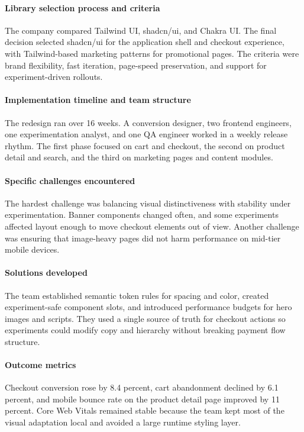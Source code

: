 \paragraph{Library selection process and criteria}
The company compared Tailwind UI, shadcn/ui, and Chakra UI. The final decision selected shadcn/ui for the application shell and checkout experience, with Tailwind-based marketing patterns for promotional pages. The criteria were brand flexibility, fast iteration, page-speed preservation, and support for experiment-driven rollouts.

\paragraph{Implementation timeline and team structure}
The redesign ran over 16 weeks. A conversion designer, two frontend engineers, one experimentation analyst, and one QA engineer worked in a weekly release rhythm. The first phase focused on cart and checkout, the second on product detail and search, and the third on marketing pages and content modules.

\paragraph{Specific challenges encountered}
The hardest challenge was balancing visual distinctiveness with stability under experimentation. Banner components changed often, and some experiments affected layout enough to move checkout elements out of view. Another challenge was ensuring that image-heavy pages did not harm performance on mid-tier mobile devices.

\paragraph{Solutions developed}
The team established semantic token rules for spacing and color, created experiment-safe component slots, and introduced performance budgets for hero images and scripts. They used a single source of truth for checkout actions so experiments could modify copy and hierarchy without breaking payment flow structure.

\paragraph{Outcome metrics}
Checkout conversion rose by 8.4 percent, cart abandonment declined by 6.1 percent, and mobile bounce rate on the product detail page improved by 11 percent. Core Web Vitals remained stable because the team kept most of the visual adaptation local and avoided a large runtime styling layer.

